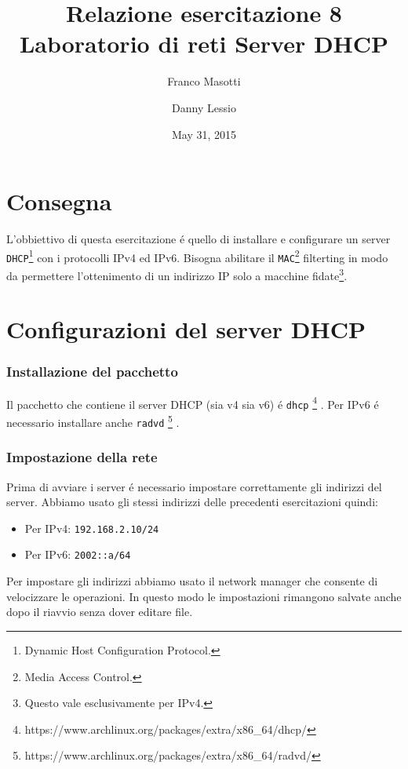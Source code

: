 \documentclass[9pt, a4paper, oneside]{article}
\title{Relazione esercitazione 8 Laboratorio di reti\newline
Server DHCP}
\author{Franco Masotti \and Danny Lessio}
\date{May 31, 2015}
\begin{document}
	\maketitle
	\tableofcontents
	\newpage
	\part{Consegna}
			\par
				L'obbiettivo di questa esercitazione \'e quello 
				di installare e configurare un server 
				\texttt{DHCP}\footnote{Dynamic Host 
				Configuration Protocol.} con 
				i protocolli IPv4 ed IPv6. Bisogna abilitare il 
				\texttt{MAC}\footnote{Media Access Control.} 
				filterting in modo da permettere l'ottenimento 
				di un indirizzo IP solo a macchine 
				fidate\footnote{Questo vale esclusivamente per 
				IPv4.}.
		\newpage
	\part{Configurazioni del server DHCP}
		\section{Installazione del pacchetto}
			\par
				Il pacchetto che contiene il server DHCP 
				(sia v4 sia v6) \'e 
				\texttt{dhcp}
				\footnote{https://www.archlinux.org/packages/extra/x86\_64/dhcp/}
				. 
				Per IPv6 \'e necessario installare anche 
				\texttt{radvd}
				\footnote{https://www.archlinux.org/packages/extra/x86\_64/radvd/}
				.
		\section{Impostazione della rete}
			\par
				Prima di avviare i server \'e necessario 
				impostare correttamente gli indirizzi del 
				server. Abbiamo usato gli stessi indirizzi 
				delle precedenti esercitazioni quindi:
				\begin{itemize}
					\item
						Per IPv4: 
						\texttt{192.168.2.10/24}
					\item
						Per IPv6: \texttt{2002::a/64}
				\end{itemize}
			\par
				Per impostare gli indirizzi abbiamo usato il 
				network manager che consente di velocizzare le 
				operazioni. In questo modo le impostazioni 
				rimangono salvate anche dopo il riavvio senza 
				dover editare file.
\end{document}
